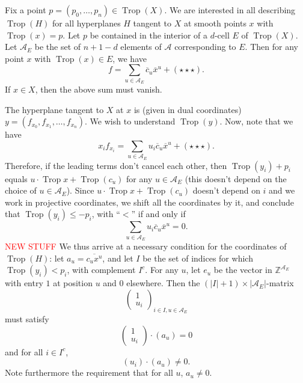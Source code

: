 \documentclass[oneside]{amsart}
\newcommand{\A}{\mathcal{A}}
\newcommand{\ZZ}{\mathbb{Z}}
\newcommand{\HOT}{(\star\star\star)}
\DeclareMathOperator{\trop}{Trop}
\theoremstyle{definition}
\newcommand{\nathan}[1]{\textcolor{red}{#1}}
\begin{document}
Fix a point $p=(p_0,\ldots,p_n)\in\trop(X)$. We are interested in all describing $\trop(H)$ for all hyperplanes $H$ tangent to $X$ at smooth points $x$ with $\trop(x)=p$. Let $p$ be contained in the interior of a $d$-cell $E$ of $\trop(X)$. Let $\A_{E}$ be the set of $n+1-d$ elements of $\A$ corresponding to $E$.
Then for any point $x$ with $\trop(x)\in E$, we have 
\[
f=\sum_{u\in\A_E} \overline{c}_u\overline{x}^u+\HOT.
\]
If $x\in X$, then the above sum must vanish.

The hyperplane tangent to $X$ at $x$ is (given in dual coordinates) $y=(f_{x_0},f_{x_1},\ldots,f_{x_n})$. We wish to understand $\trop(y)$. Now, note that we have
\[
x_if_{x_i}=\sum_{u\in\A_E} u_i\overline{c}_u\overline{x}^u+\HOT.
\]
Therefore, if the leading terms don't cancel each other, then $\trop(y_i)+p_i$ equals $u\cdot\trop{x} +\trop(c_u)$ for any $u\in\A_E$ (this doesn't depend on the choice of  $u\in\A_E$). Since $u\cdot\trop{x} + \trop(c_u)$ doesn't depend on $i$ and we work in projective coordinates, we shift all the coordinates by it, and conclude that $\trop(y_i)\leq -p_i$, with ``$<$'' if and only if 
\begin{equation}\label{eqn:df}
\sum_{u\in\A_E} u_i\overline{c}_u\overline{x}^u=0.
\end{equation}
\nathan{NEW STUFF}
We thus arrive at a necessary condition for the coordinates of $\trop(H)$: let $a_u=\overline{c_u x^u}$, and let $I$ be the set of indices for which $\trop(y_i)<p_i$, with complement $I^c$.
For any $u$, let $e_u$ be the vector in $\ZZ^{\A_E}$ with entry $1$ at position $u$ and $0$ elsewhere.
Then the $(|I|+1)\times |\A_E|$-matrix 
\begin{equation}\label{eqn:s1}
\left(\begin{array}{c}
1\\
u_{i}
\end{array}\right)_{i\in I,u\in \A_E}
\end{equation}
must satisfy
\begin{equation}\label{eqn:s2}
\left(\begin{array}{c}
1\\
u_{i}
\end{array}\right)\cdot (a_u)=0
\end{equation}
and for all $i\in I^c$,
\begin{equation}\label{eqn:s3}
(u_i)\cdot (a_u)\neq 0.
\end{equation}
Note furthermore the requirement that for all $u$, $a_u\neq 0$.
\end{document}
